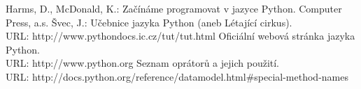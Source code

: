 \begin{thebibliography}{5}
%
Harms, D., McDonald, K.: Začínáme programovat v jazyce Python.
Computer Press, a.s.
%
Švec, J.: Učebnice jazyka Python (aneb Létající cirkus).\\
URL: http://www.pythondocs.ic.cz/tut/tut.html
%
Oficiální webová stránka jazyka Python.\\
URL: http://www.python.org
%
Seznam oprátorů a jejich použití.\\
URL: http://docs.python.org/reference/datamodel.html\#special-method-names

\end{thebibliography}

